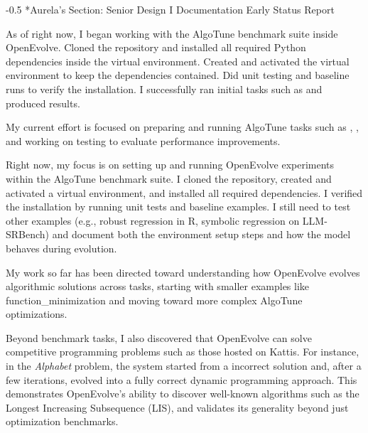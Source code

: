 \documentclass[11pt,letterpaper]{article}
\makeatletter
\renewcommand{\section}{\@startsection{section}{1}{0mm}%
                                {-\baselineskip}{0.5\baselineskip}%
                                {\normalfont\large\bfseries\centering}}
\makeatother
\begin{document}
\section*{Aurela's Section: Senior Design I Documentation Early Status Report}

As of right now, I began working with the AlgoTune benchmark suite inside OpenEvolve. Cloned the repository and installed all required Python dependencies inside the virtual environment. Created and activated the virtual environment to keep the dependencies contained. Did unit testing and baseline runs to verify the installation. I successfully ran initial tasks such as  and produced results. 

\bigskip

My current effort is focused on preparing and running AlgoTune tasks such as , , and working on testing  to evaluate performance improvements.  

\bigskip

Right now, my focus is on setting up and running OpenEvolve experiments within the AlgoTune benchmark suite. I cloned the repository, created and activated a virtual environment, and installed all required dependencies. I verified the installation by running unit tests and baseline examples. I still need to test other examples (e.g., robust regression in R, symbolic regression on LLM-SRBench) and document both the environment setup steps and how the model behaves during evolution.

\bigskip

My work so far has been directed toward understanding how OpenEvolve evolves algorithmic solutions across tasks, starting with smaller examples like function\_minimization and moving toward more complex AlgoTune optimizations. 

\bigskip

Beyond benchmark tasks, I also discovered that OpenEvolve can solve competitive programming problems such as those hosted on Kattis. For instance, in the \textit{Alphabet} problem, the system started from a incorrect solution and, after a few iterations, evolved into a fully correct dynamic programming approach. This demonstrates OpenEvolve’s ability to discover well-known algorithms such as the Longest Increasing Subsequence (LIS), and validates its generality beyond just optimization benchmarks.

\bigskip
\end{document}
